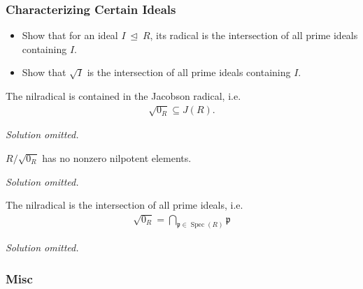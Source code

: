 \hypertarget{characterizing-certain-ideals}{%
\subsubsection{Characterizing Certain
Ideals}\label{characterizing-certain-ideals}}

\begin{itemize}
\tightlist
\item
  Show that for an ideal \(I{~\trianglelefteq~}R\), its radical is the
  intersection of all prime ideals containing \(I\).
\item
  Show that \(\sqrt{I}\) is the intersection of all prime ideals
  containing \(I\).
\end{itemize}

\begin{problem}

The nilradical is contained in the Jacobson radical, i.e.
\begin{align*}
{\sqrt{0_{R}} } \subseteq J(R)
.\end{align*}

\end{problem}

\emph{Solution omitted.}

\begin{problem}

\(R/ {\sqrt{0_{R}} }\) has no nonzero nilpotent elements.

\end{problem}

\emph{Solution omitted.}

\begin{problem}

The nilradical is the intersection of all prime ideals, i.e.
\begin{align*}
{\sqrt{0_{R}} } = \displaystyle\bigcap_{\mathfrak{p} \in \operatorname{Spec}(R)} \mathfrak{p}
\end{align*}

\end{problem}

\emph{Solution omitted.}

\hypertarget{misc-1}{%
\subsubsection{Misc}\label{misc-1}}


